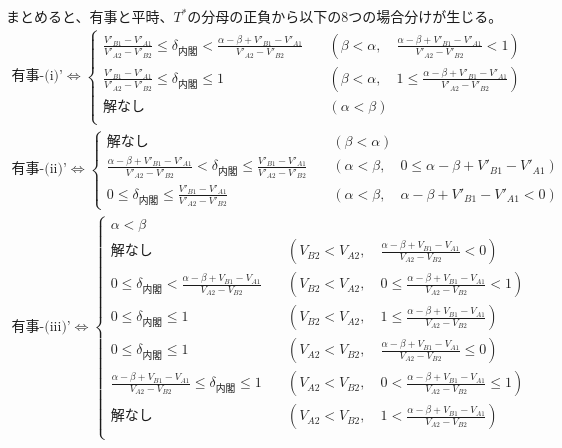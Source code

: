 \documentclass[main.tex]{subfiles}
\begin{document}
\newpage
まとめると、有事と平時、$T^*$の分母の正負から以下の8つの場合分けが生じる。
\begin{align*}
    \text{有事-(i)'} \Leftrightarrow 
    \begin{cases}
        \frac{ V'_{B1} - V'_{A1} }{ V'_{A2} - V'_{B2} } \le \delta_{内閣} <  \frac{\alpha-\beta + V'_{B1}-V'_{A1}}{V'_{A2} - V'_{B2}} \quad &(\beta < \alpha, \quad \frac{\alpha-\beta + V'_{B1}-V'_{A1}}{V'_{A2} - V'_{B2}} < 1) \\[1em]
        \frac{ V'_{B1} - V'_{A1} }{ V'_{A2} - V'_{B2} } \le \delta_{内閣} \le 1 \quad &(\beta < \alpha, \quad 1 \le \frac{\alpha-\beta + V'_{B1}-V'_{A1}}{V'_{A2} - V'_{B2}}) \\[1em]
        解なし \quad &(\alpha < \beta)\\[1em]
    \end{cases}
\end{align*}
\begin{align*}
    \text{有事-(ii)'} \Leftrightarrow 
    \begin{cases}
        解なし   \quad &(\beta < \alpha) \\[1em]
        \frac{\alpha-\beta + V'_{B1}-V'_{A1}}{V'_{A2} - V'_{B2}} < \delta_{内閣} \le \frac{ V'_{B1} - V'_{A1} }{ V'_{A2} - V'_{B2} }  \quad &(\alpha < \beta, \quad 0 \le \alpha-\beta + V'_{B1}-V'_{A1}) \\[1em]
        0 \le \delta_{内閣} \le \frac{ V'_{B1} - V'_{A1} }{ V'_{A2} - V'_{B2} }  \quad &(\alpha < \beta, \quad \alpha-\beta + V'_{B1}-V'_{A1} < 0)
    \end{cases}
\end{align*}
\begin{align*}
    \text{有事-(iii)'} \Leftrightarrow 
    \begin{cases}
        \alpha < \beta \\[1em]
        解なし \quad &( V_{B2} < V_{A2} ,\quad \frac{\alpha-\beta + V_{B1}-V_{A1}}{V_{A2} - V_{B2}} < 0 )\\[1em]
        0 \le \delta_{内閣} < \frac{\alpha-\beta + V_{B1}-V_{A1}}{V_{A2} - V_{B2}}  \quad &( V_{B2} < V_{A2} ,\quad 0 \le \frac{\alpha-\beta + V_{B1}-V_{A1}}{V_{A2} - V_{B2}} < 1) \\[1em]
        0 \le \delta_{内閣} \le 1  \quad &( V_{B2} < V_{A2} ,\quad 1 \le \frac{\alpha-\beta + V_{B1}-V_{A1}}{V_{A2} - V_{B2}}) \\[1em]
        0 \le \delta_{内閣} \le 1 \quad &( V_{A2} < V_{B2} ,\quad \frac{\alpha-\beta + V_{B1}-V_{A1}}{V_{A2} - V_{B2}} \le 0 )\\[1em]
        \frac{\alpha-\beta + V_{B1}-V_{A1}}{V_{A2} - V_{B2}} \le \delta_{内閣} \le 1  \quad &( V_{A2} < V_{B2} ,\quad 0 < \frac{\alpha-\beta + V_{B1}-V_{A1}}{V_{A2} - V_{B2}} \le 1) \\[1em]
        解なし  \quad &( V_{A2} < V_{B2} ,\quad 1 < \frac{\alpha-\beta + V_{B1}-V_{A1}}{V_{A2} - V_{B2}}) \\[1em]
    \end{cases}
\end{align*}
\end{document}
